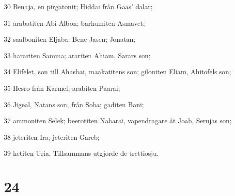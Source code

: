 \par 30 Benaja, en pirgatonit; Hiddai från Gaas' dalar;
\par 31 arabatiten Abi-Albon; barhumiten Asmavet;
\par 32 saalboniten Eljaba; Bene-Jasen; Jonatan;
\par 33 harariten Samma; arariten Ahiam, Sarars son;
\par 34 Elifelet, son till Ahasbai, maakatitens son; giloniten Eliam, Ahitofels son;
\par 35 Hesro från Karmel; arabiten Paarai;
\par 36 Jigeal, Natans son, från Soba; gaditen Bani;
\par 37 ammoniten Selek; beerotiten Naharai, vapendragare åt Joab, Serujas son;
\par 38 jeteriten Ira; jeteriten Gareb;
\par 39 hetiten Uria. Tillsammans utgjorde de trettiosju.

\chapter{24}

